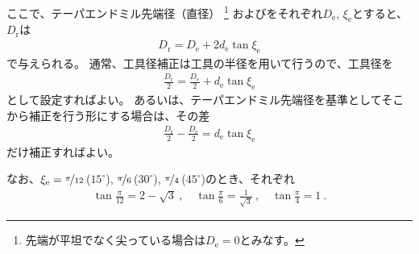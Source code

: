 ここで、テーパエンドミル先端径（直径）
\footnote{先端が平坦でなく尖っている場合は$D_\mathrm e = 0$とみなす。}
および\TaperEndMillAngle をそれぞれ$D_\mathrm e$, $\xi_\mathrm e$とすると、\TaperEndMillReferenceDiameter$D_\mathrm r$は
\begin{align*}
  D_\mathrm r = D_\mathrm e+2d_\mathrm e\tan\xi_\mathrm e
\end{align*}
で与えられる。
通常、工具径補正は工具の半径を用いて行うので、工具径を
\begin{align*}
  \frac{D_\mathrm r}2 = \frac{D_\mathrm e}2+d_\mathrm e\tan\xi_\mathrm e
\end{align*}
として設定すればよい。
あるいは、テーパエンドミル先端径を基準としてそこから補正を行う形にする場合は、その差
\begin{align*}
  \frac{D_\mathrm r}2-\frac{D_\mathrm e}2 = d_\mathrm e\tan\xi_\mathrm e
\end{align*}
だけ補正すればよい。
\begin{hosoku}
なお、$\xi_\mathrm e = \nicefrac\pi{12}$\,($15^\circ$), $\nicefrac\pi6$\,($30^\circ$), $\nicefrac\pi4$\,($45^\circ$)のとき、それぞれ
\begin{align*}
  \tan\frac\pi{12} = 2-\sqrt3\ , \quad
  \tan\frac\pi6 = \frac1{\sqrt3}\ , \quad
  \tan\frac\pi4 = 1\ .
\end{align*}
\end{hosoku}



